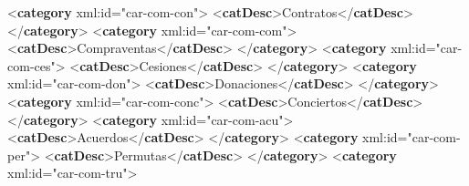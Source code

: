 \documentclass[
]{book}
\newenvironment{Shaded}{\begin{snugshade}}{\end{snugshade}}
\newcommand{\KeywordTok}[1]{\textcolor[rgb]{0.13,0.29,0.53}{\textbf{#1}}}
\newcommand{\NormalTok}[1]{#1}
\newcommand{\OtherTok}[1]{\textcolor[rgb]{0.56,0.35,0.01}{#1}}
\newcommand{\StringTok}[1]{\textcolor[rgb]{0.31,0.60,0.02}{#1}}
\begin{document}
\begin{Shaded}
\begin{Highlighting}[]
\NormalTok{          \textless{}}\KeywordTok{category}\OtherTok{ xml:id=}\StringTok{"car{-}com{-}con"}\NormalTok{\textgreater{}}
\NormalTok{             \textless{}}\KeywordTok{catDesc}\NormalTok{\textgreater{}Contratos\textless{}/}\KeywordTok{catDesc}\NormalTok{\textgreater{}}
\NormalTok{          \textless{}/}\KeywordTok{category}\NormalTok{\textgreater{}}
\NormalTok{          \textless{}}\KeywordTok{category}\OtherTok{ xml:id=}\StringTok{"car{-}com{-}com"}\NormalTok{\textgreater{}}
\NormalTok{             \textless{}}\KeywordTok{catDesc}\NormalTok{\textgreater{}Compraventas\textless{}/}\KeywordTok{catDesc}\NormalTok{\textgreater{}}
\NormalTok{          \textless{}/}\KeywordTok{category}\NormalTok{\textgreater{}}
\NormalTok{          \textless{}}\KeywordTok{category}\OtherTok{ xml:id=}\StringTok{"car{-}com{-}ces"}\NormalTok{\textgreater{}}
\NormalTok{             \textless{}}\KeywordTok{catDesc}\NormalTok{\textgreater{}Cesiones\textless{}/}\KeywordTok{catDesc}\NormalTok{\textgreater{}}
\NormalTok{          \textless{}/}\KeywordTok{category}\NormalTok{\textgreater{}}
\NormalTok{          \textless{}}\KeywordTok{category}\OtherTok{ xml:id=}\StringTok{"car{-}com{-}don"}\NormalTok{\textgreater{}}
\NormalTok{             \textless{}}\KeywordTok{catDesc}\NormalTok{\textgreater{}Donaciones\textless{}/}\KeywordTok{catDesc}\NormalTok{\textgreater{}}
\NormalTok{          \textless{}/}\KeywordTok{category}\NormalTok{\textgreater{}}
\NormalTok{          \textless{}}\KeywordTok{category}\OtherTok{ xml:id=}\StringTok{"car{-}com{-}conc"}\NormalTok{\textgreater{}}
\NormalTok{             \textless{}}\KeywordTok{catDesc}\NormalTok{\textgreater{}Conciertos\textless{}/}\KeywordTok{catDesc}\NormalTok{\textgreater{}}
\NormalTok{          \textless{}/}\KeywordTok{category}\NormalTok{\textgreater{}}
\NormalTok{          \textless{}}\KeywordTok{category}\OtherTok{ xml:id=}\StringTok{"car{-}com{-}acu"}\NormalTok{\textgreater{}}
\NormalTok{             \textless{}}\KeywordTok{catDesc}\NormalTok{\textgreater{}Acuerdos\textless{}/}\KeywordTok{catDesc}\NormalTok{\textgreater{}}
\NormalTok{          \textless{}/}\KeywordTok{category}\NormalTok{\textgreater{}}
\NormalTok{          \textless{}}\KeywordTok{category}\OtherTok{ xml:id=}\StringTok{"car{-}com{-}per"}\NormalTok{\textgreater{}}
\NormalTok{             \textless{}}\KeywordTok{catDesc}\NormalTok{\textgreater{}Permutas\textless{}/}\KeywordTok{catDesc}\NormalTok{\textgreater{}}
\NormalTok{          \textless{}/}\KeywordTok{category}\NormalTok{\textgreater{}}
\NormalTok{          \textless{}}\KeywordTok{category}\OtherTok{ xml:id=}\StringTok{"car{-}com{-}tru"}\NormalTok{\textgreater{}}

\end{Highlighting}
\end{Shaded}
\end{document}
